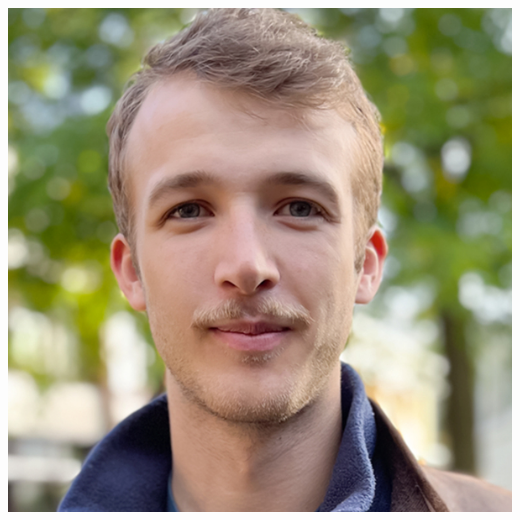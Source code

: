 \documentclass[aspectratio=169]{beamer}
\begin{document}
\begin{frame}
\begin{columns}
\includegraphics[width=\textwidth]{people/toby_lovick}
    \end{columns}
\end{frame}
\end{document}
